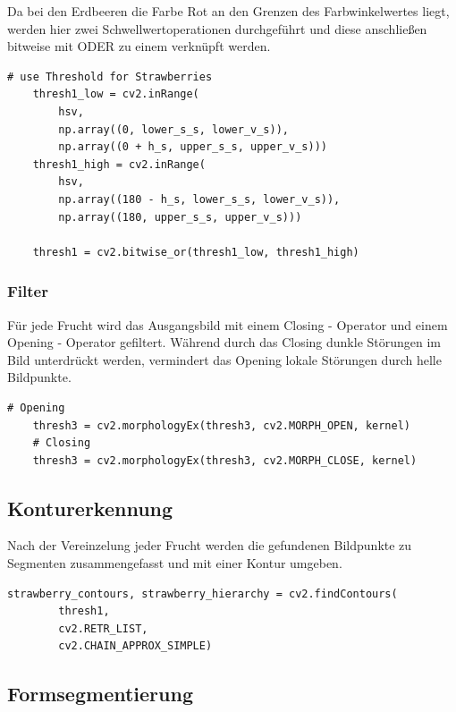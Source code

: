 Da bei den Erdbeeren die Farbe Rot an den Grenzen des Farbwinkelwertes liegt, werden hier zwei Schwellwertoperationen durchgeführt und diese anschließen bitweise mit ODER zu einem verknüpft werden.
\lstset{language=Python}
\begin{lstlisting}[]
    # use Threshold for Strawberries
    thresh1_low = cv2.inRange(
        hsv,
        np.array((0, lower_s_s, lower_v_s)),
        np.array((0 + h_s, upper_s_s, upper_v_s)))
    thresh1_high = cv2.inRange(
        hsv,
        np.array((180 - h_s, lower_s_s, lower_v_s)),
        np.array((180, upper_s_s, upper_v_s)))

    thresh1 = cv2.bitwise_or(thresh1_low, thresh1_high)
\end{lstlisting}

\subsubsection{Filter}

Für jede Frucht wird das Ausgangsbild mit einem Closing - Operator und einem Opening - Operator gefiltert. Während durch das Closing dunkle Störungen im Bild unterdrückt werden, vermindert das Opening lokale Störungen durch helle Bildpunkte.  \\
\lstset{language=Python}
\begin{lstlisting}[]
    # Opening
    thresh3 = cv2.morphologyEx(thresh3, cv2.MORPH_OPEN, kernel)
    # Closing
    thresh3 = cv2.morphologyEx(thresh3, cv2.MORPH_CLOSE, kernel)
\end{lstlisting}

\subsection{Konturerkennung}
Nach der Vereinzelung jeder Frucht werden die gefundenen Bildpunkte zu Segmenten zusammengefasst und mit einer Kontur umgeben. 

\lstset{language=Python}
\begin{lstlisting}[]
    strawberry_contours, strawberry_hierarchy = cv2.findContours(
        thresh1,
        cv2.RETR_LIST,
        cv2.CHAIN_APPROX_SIMPLE)
\end{lstlisting}

\subsection{Formsegmentierung}

